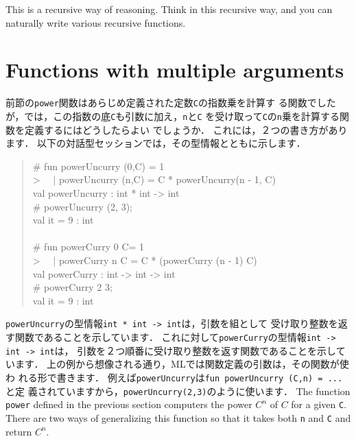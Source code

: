 \documentclass{jbook}
\newcommand{\txt}[2]{#2}
\begin{document}
	This is a recursive way of reasoning.
	Think in this recursive way, and you can naturally write various
recursive functions.
\fi%

\section{\txt{複数の引数を取る関数}{Functions with multiple arguments}}
\label{sec:tutorialMultiargfun}

\ifjp%
	前節の{\tt power}関数はあらじめ定義された定数{\tt C}の指数乗を計算す
る関数でしたが，では，この指数の底{\tt C}も引数に加え，{\tt n}と{\tt C}
を受け取って{\tt C}の{\tt n}乗を計算する関数を定義するにはどうしたらよい
でしょうか．
	これには，２つの書き方があります．
	以下の対話型セッションでは，その型情報とともに示します．
\begin{tt}
\begin{quote}
\# fun powerUncurry (0,C) = 1\\
> \ \ | powerUncurry (n,C) = C * powerUncurry(n - 1, C)\\
val powerUncurry : int * int -> int\\
\# powerUncurry (2, 3);\\
val it = 9 : int\\
\ \\
\# fun powerCurry 0 C= 1\\
> \ \ | powerCurry n C = C * (powerCurry (n - 1) C)\\
val powerCurry : int -> int -> int\\
\# powerCurry 2 3;\\
val it = 9 : int
\end{quote}
\end{tt}
	{\tt powerUncurry}の型情報{\tt int * int -> int}は，引数を組として
受け取り整数を返す関数であることを示しています．
	これに対して{\tt powerCurry}の型情報{\tt int -> int -> int}は，
引数を２つ順番に受け取り整数を返す関数であることを示しています．
	上の例から想像される通り，MLでは関数定義の引数は，その関数が使わ
れる形で書きます．
	例えば{\tt powerUncurry}は{\tt fun powerUncurry (C,n) = ...}と定
義されていますから，{\tt powerUncurry(2,3)}のように使います．
\else%
	The function {\tt power} defined in the previous section
computers the power $C^n$ of $C$ for a given {\tt C}.
	There are two ways of generalizing this function so that it takes 
both {\tt n} and {\tt C} and return $C^n$.
\end{document}

